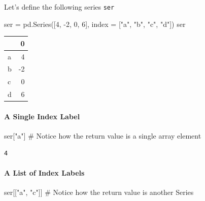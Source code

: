\documentclass[
  letterpaper,
  DIV=11,
  numbers=noendperiod]{scrreprt}
\let\oldparagraph\paragraph
\renewcommand{\paragraph}[1]{\oldparagraph{#1}\mbox{}}
\newenvironment{Shaded}{\begin{snugshade}}{\end{snugshade}}
\newcommand{\CommentTok}[1]{\textcolor[rgb]{0.37,0.37,0.37}{#1}}
\newcommand{\DecValTok}[1]{\textcolor[rgb]{0.68,0.00,0.00}{#1}}
\newcommand{\NormalTok}[1]{\textcolor[rgb]{0.00,0.23,0.31}{#1}}
\newcommand{\OperatorTok}[1]{\textcolor[rgb]{0.37,0.37,0.37}{#1}}
\newcommand{\StringTok}[1]{\textcolor[rgb]{0.13,0.47,0.30}{#1}}
\begin{document}
Let's define the following series \texttt{ser}

\begin{Shaded}
\begin{Highlighting}[]
\NormalTok{ser }\OperatorTok{=}\NormalTok{ pd.Series([}\DecValTok{4}\NormalTok{, }\OperatorTok{{-}}\DecValTok{2}\NormalTok{, }\DecValTok{0}\NormalTok{, }\DecValTok{6}\NormalTok{], index }\OperatorTok{=}\NormalTok{ [}\StringTok{"a"}\NormalTok{, }\StringTok{"b"}\NormalTok{, }\StringTok{"c"}\NormalTok{, }\StringTok{"d"}\NormalTok{])}
\NormalTok{ser}
\end{Highlighting}
\end{Shaded}

\begin{tabular}{lr}
\toprule
{} &  0 \\
\midrule
a &  4 \\
b & -2 \\
c &  0 \\
d &  6 \\
\bottomrule
\end{tabular}

\hypertarget{a-single-index-label}{%
\paragraph{A Single Index Label}\label{a-single-index-label}}

\begin{Shaded}
\begin{Highlighting}[]
\NormalTok{ser[}\StringTok{"a"}\NormalTok{] }\CommentTok{\# Notice how the return value is a single array element}
\end{Highlighting}
\end{Shaded}

\begin{verbatim}
4
\end{verbatim}

\hypertarget{a-list-of-index-labels}{%
\paragraph{A List of Index Labels}\label{a-list-of-index-labels}}

\begin{Shaded}
\begin{Highlighting}[]
\NormalTok{ser[[}\StringTok{"a"}\NormalTok{, }\StringTok{"c"}\NormalTok{]] }\CommentTok{\# Notice how the return value is another Series}
\end{Highlighting}
\end{Shaded}
\end{document}
